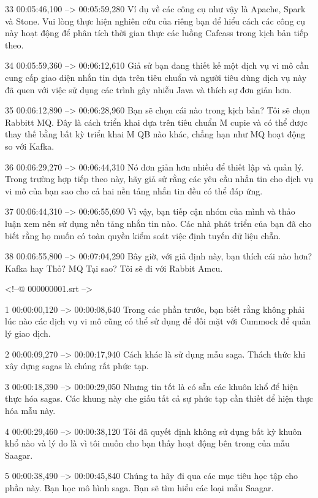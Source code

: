 33
00:05:46,100 --> 00:05:59,280
Ví dụ về các công cụ như vậy là Apache, Spark và Stone.  Vui lòng thực hiện nghiên cứu của riêng bạn để hiểu cách các công cụ này hoạt động để phân tích thời gian thực các luồng Cafcass trong kịch bản tiếp theo.

34
00:05:59,360 --> 00:06:12,610
Giả sử bạn đang thiết kế một dịch vụ vi mô cần cung cấp giao diện nhắn tin dựa trên tiêu chuẩn và người tiêu dùng dịch vụ này đã quen với việc sử dụng các trình gây nhiễu Java và thích sự đơn giản hơn.

35
00:06:12,890 --> 00:06:28,960
Bạn sẽ chọn cái nào trong kịch bản?  Tôi sẽ chọn Rabbitt MQ.  Đây là cách triển khai dựa trên tiêu chuẩn M cupie và có thể được thay thế bằng bất kỳ triển khai M QB nào khác, chẳng hạn như MQ hoạt động so với Kafka.

36
00:06:29,270 --> 00:06:44,310
Nó đơn giản hơn nhiều để thiết lập và quản lý.  Trong trường hợp tiếp theo này, hãy giả sử rằng các yêu cầu nhắn tin cho dịch vụ vi mô của bạn sao cho cả hai nền tảng nhắn tin đều có thể đáp ứng.

37
00:06:44,310 --> 00:06:55,690
Vì vậy, bạn tiếp cận nhóm của mình và thảo luận xem nên sử dụng nền tảng nhắn tin nào.  Các nhà phát triển của bạn đã cho biết rằng họ muốn có toàn quyền kiểm soát việc định tuyến dữ liệu chẵn.

38
00:06:55,800 --> 00:07:04,290
Bây giờ, với giả định này, bạn thích cái nào hơn?  Kafka hay Thỏ?  MQ Tại sao?  Tôi sẽ đi với Rabbit Amcu.

<!--@ 000000001.srt -->

1
00:00:00,120 --> 00:00:08,640
Trong các phần trước, bạn biết rằng không phải lúc nào các dịch vụ vi mô cũng có thể sử dụng để đối mặt với Cummock để quản lý giao dịch.

2
00:00:09,270 --> 00:00:17,940
Cách khác là sử dụng mẫu saga.  Thách thức khi xây dựng sagas là chúng rất phức tạp.

3
00:00:18,390 --> 00:00:29,050
Nhưng tin tốt là có sẵn các khuôn khổ để hiện thực hóa sagas.  Các khung này che giấu tất cả sự phức tạp cần thiết để hiện thực hóa mẫu này.

4
00:00:29,460 --> 00:00:38,120
Tôi đã quyết định không sử dụng bất kỳ khuôn khổ nào và lý do là vì tôi muốn cho bạn thấy hoạt động bên trong của mẫu Saagar.

5
00:00:38,490 --> 00:00:45,840
Chúng ta hãy đi qua các mục tiêu học tập cho phần này.  Bạn học mô hình saga.  Bạn sẽ tìm hiểu các loại mẫu Saagar.

